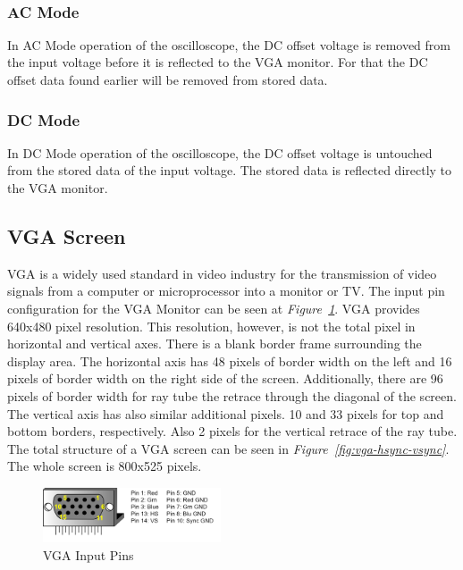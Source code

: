 \documentclass[paper]{IEEEtran}
\begin{document}
\- \\

\subsubsection*{AC Mode} \- \indent
	In AC Mode operation of the oscilloscope, the DC offset voltage is removed from the input voltage before it is reflected to the VGA monitor. For that the DC offset data found earlier will be removed from stored data.

\subsubsection*{DC Mode} \- \indent
	In DC Mode operation of the oscilloscope, the DC offset voltage is untouched from the stored data of the input voltage. The stored data is reflected directly to the VGA monitor. 
	

\subsection{VGA Screen} \- \indent
VGA is a widely used standard in video industry for the transmission of video signals from a computer or microprocessor into a monitor or TV. The input pin configuration for the VGA Monitor can be seen at \textit{Figure~\ref{fig:vga_pins}}. VGA provides 640x480 pixel resolution. This resolution, however, is not the total pixel in horizontal and vertical axes. There is a blank border frame surrounding the display area. The horizontal axis has 48 pixels of border width on the left and 16 pixels of border width on the right side of the screen. Additionally, there are 96 pixels of border width for ray tube the retrace through the diagonal of the screen. The vertical axis has also similar additional pixels. 10 and 33 pixels for top and bottom borders, respectively. Also 2 pixels for the vertical retrace of the ray tube. The total structure of a VGA screen can be seen in \textit{Figure~\ref{fig:vga-hsync-vsync}}. The whole screen is 800x525 pixels.

\begin{figure}[h!]
	\setlength{\unitlength}{\textwidth}
	\center 
	\includegraphics[width=0.47\textwidth]{vgapins}
	\caption{\label{fig:vga_pins} VGA Input Pins}
\end{figure}
\end{document}
